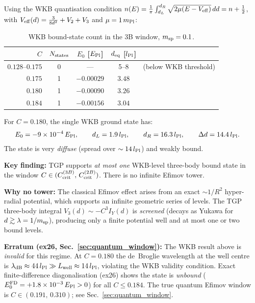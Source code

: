 Using the WKB quantisation condition
$n(E) = \frac{1}{\pi}\int_{d_L}^{d_R}\sqrt{2\mu(E-V_{\rm eff})}\,dd = n+\tfrac{1}{2}$,
with $V_{\rm eff}(d)=\frac{3}{8d^2}+V_2+V_3$ and
$\mu=1\,m_{\rm Pl}$:

\begin{table}[h]
\centering
\caption{WKB bound-state count in the 3B window, $m_{\rm sp}=0.1$.}
\label{tab:wkb_count}
\begin{tabular}{rcccr}
\hline
$C$ & $N_{\rm states}$ & $E_0$ [$E_{\rm Pl}$] & $d_{\rm eq}$ [$l_{\rm Pl}$] & \\
\hline
$0.128$--$0.175$ & 0 & --- & 5--8 & (below WKB threshold) \\
$0.175$ & 1 & $-0.00029$ & $3.48$ & \\
$0.180$ & 1 & $-0.00090$ & $3.26$ & \\
$0.184$ & 1 & $-0.00156$ & $3.04$ & \\
\hline
\end{tabular}
\end{table}

For $C=0.180$, the single WKB ground state has:
\begin{equation}
  E_0 = -9\times10^{-4}\,E_{\rm Pl},\qquad
  d_L = 1.9\,l_{\rm Pl},\qquad
  d_R = 16.3\,l_{\rm Pl},\qquad
  \Delta d = 14.4\,l_{\rm Pl}.
\end{equation}
The state is very \emph{diffuse} (spread over $\sim14\,l_{\rm Pl}$) and weakly bound.

\textbf{Key finding:} TGP supports \emph{at most one} WKB-level three-body bound
state in the window $C\in(C_{\rm crit}^{(3B)},\,C_{\rm crit}^{(2B)})$.
There is no infinite Efimov tower.

\textbf{Why no tower:} The classical Efimov effect arises from an exact $\sim1/R^2$
hyper-radial potential, which supports an infinite geometric series of levels.
The TGP three-body integral $V_3(d)\sim -C^3 I_Y(d)$ is \emph{screened}
(decays as Yukawa for $d\gtrsim\lambda=1/m_{\rm sp}$), producing only a
finite potential well and at most one or two bound levels.

\medskip
\noindent\textbf{Erratum (ex26, Sec.~\ref{sec:quantum_window}):}
The WKB result above is \emph{invalid} for this regime.
At $C=0.180$ the de~Broglie wavelength at the well centre is
$\lambda_{\rm dB}\approx44\,l_{\rm Pl}\gg L_{\rm well}\approx14\,l_{\rm Pl}$,
violating the WKB validity condition.
Exact finite-difference diagonalisation (ex26) shows the state
is \emph{unbound} ($E_0^{\rm FD}=+1.8\times10^{-3}\,E_{\rm Pl}>0$)
for all $C\leq0.184$.  The true quantum Efimov window is
$C\in(0.191,\,0.310)$; see Sec.~\ref{sec:quantum_window}.

